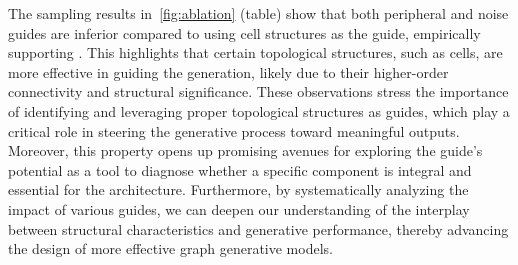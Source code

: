 The sampling results in~\cref{fig:ablation} (table) show that both peripheral and noise guides are inferior compared to using cell structures as the guide, empirically supporting . 
This highlights that certain topological structures, such as cells, are more effective in guiding the generation, likely due to their higher-order connectivity and structural significance. 
%
These observations stress the importance of identifying and leveraging proper topological structures as guides, which play a critical role in steering the generative process toward meaningful outputs. 
Moreover, this property opens up promising avenues for exploring the guide’s potential as a tool to diagnose whether a specific component is integral and essential for the architecture.
Furthermore, by systematically analyzing the impact of various guides, we can deepen our understanding of the interplay between structural characteristics and generative performance, thereby advancing the design of more effective graph generative models.






